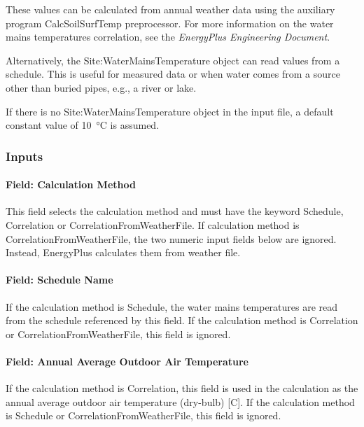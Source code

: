 These values can be calculated from annual weather data using the auxiliary program CalcSoilSurfTemp preprocessor. For more information on the water mains temperatures correlation, see the \emph{EnergyPlus Engineering Document}.

Alternatively, the Site:WaterMainsTemperature object can read values from a schedule. This is useful for measured data or when water comes from a source other than buried pipes, e.g., a river or lake.

If there is no Site:WaterMainsTemperature object in the input file, a default constant value of \SI{10}{\degreeCelsius} is assumed.

\subsubsection{Inputs}\label{inputs-21-003}

\paragraph{Field: Calculation Method}\label{field-calculation-method}

This field selects the calculation method and must have the keyword Schedule, Correlation or CorrelationFromWeatherFile. If calculation method is CorrelationFromWeatherFile, the two numeric input fields below are ignored. Instead, EnergyPlus calculates them from weather file.

\paragraph{Field: Schedule Name}\label{field-schedule-name-003}

If the calculation method is Schedule, the water mains temperatures are read from the schedule referenced by this field. If the calculation method is Correlation or CorrelationFromWeatherFile, this field is ignored.

\paragraph{Field: Annual Average Outdoor Air Temperature}\label{field-annual-average-outdoor-air-temperature}

If the calculation method is Correlation, this field is used in the calculation as the annual average outdoor air temperature (dry-bulb) {[}C{]}. If the calculation method is Schedule or CorrelationFromWeatherFile, this field is ignored.

